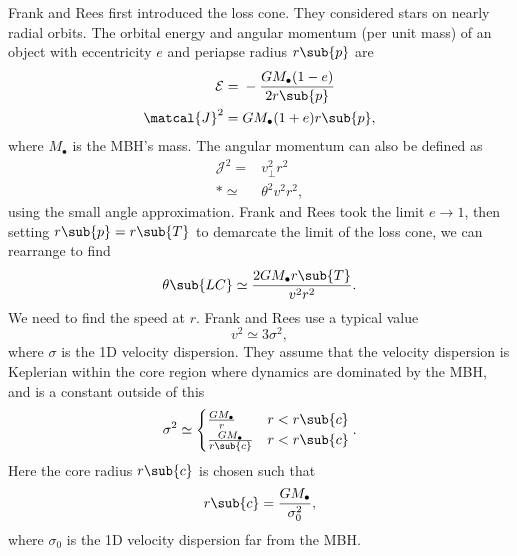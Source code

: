 Frank and Rees first introduced the loss cone. They considered stars on nearly radial orbits. The orbital energy and angular momentum (per unit mass) of an object with eccentricity $e$ and periapse radius $r\sub{p}$ are
\begin{align}
\mathcal{E} = {} & -\frac{GM_\bullet(1 - e)}{2r\sub{p}} \\
\matcal{J}^2 = {} & GM_\bullet(1 + e)r\sub{p},
\end{align}
where $M_\bullet$ is the MBH's mass. The angular momentum can also be defined as
\begin{align}
\mathcal{J}^2 = {} & v_\perp^2r^2 \nonumber \\*
 \simeq {} & \theta^2v^2r^2,
\end{align}
using the small angle approximation. Frank and Rees took the limit $e \rightarrow 1$, then setting $r\sub{p} = r\sub{T}$ to demarcate the limit of the loss cone, we can rearrange to find
\begin{equation}
\theta\sub{LC} \simeq \frac{2GM_\bullet r\sub{T}}{v^2r^2}.
\end{equation}
We need to find the speed at $r$. Frank and Rees use a typical value
\begin{equation}
v^2 \simeq 3\sigma^2,
\end{equation}
where $\sigma$ is the 1D velocity dispersion. They assume that the velocity dispersion is Keplerian within the core region where dynamics are dominated by the MBH, and is a constant outside of this
\begin{equation}
\sigma^2 \simeq \begin{cases}
\frac{GM_\bullet}{r} & r < r\sub{c} \\
\frac{GM_\bullet}{r\sub{c}} & r < r\sub{c}
\end{cases}.
\end{equation}
Here the core radius $r\sub{c}$ is chosen such that
\begin{equation}
r\sub{c} = \frac{GM_\bullet}{\sigma_0^2},
\end{equation}
where $\sigma_0$ is the 1D velocity dispersion far from the MBH.
